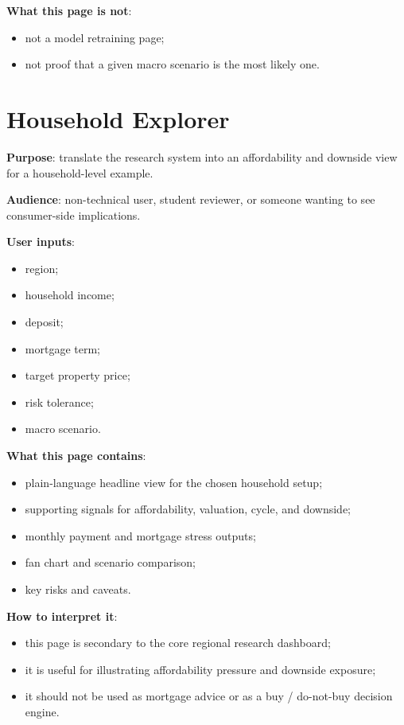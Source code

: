 \documentclass[11pt,a4paper]{article}
\begin{document}
\textbf{What this page is not}:
\begin{itemize}[leftmargin=1.5em]
  \item not a model retraining page;
  \item not proof that a given macro scenario is the most likely one.
\end{itemize}

\section{Household Explorer}

\textbf{Purpose}: translate the research system into an affordability and
downside view for a household-level example.

\textbf{Audience}: non-technical user, student reviewer, or someone wanting to
see consumer-side implications.

\textbf{User inputs}:
\begin{itemize}[leftmargin=1.5em]
  \item region;
  \item household income;
  \item deposit;
  \item mortgage term;
  \item target property price;
  \item risk tolerance;
  \item macro scenario.
\end{itemize}

\textbf{What this page contains}:
\begin{itemize}[leftmargin=1.5em]
  \item plain-language headline view for the chosen household setup;
  \item supporting signals for affordability, valuation, cycle, and downside;
  \item monthly payment and mortgage stress outputs;
  \item fan chart and scenario comparison;
  \item key risks and caveats.
\end{itemize}

\textbf{How to interpret it}:
\begin{itemize}[leftmargin=1.5em]
  \item this page is secondary to the core regional research dashboard;
  \item it is useful for illustrating affordability pressure and downside exposure;
  \item it should not be used as mortgage advice or as a buy / do-not-buy decision engine.
\end{itemize}
\end{document}
